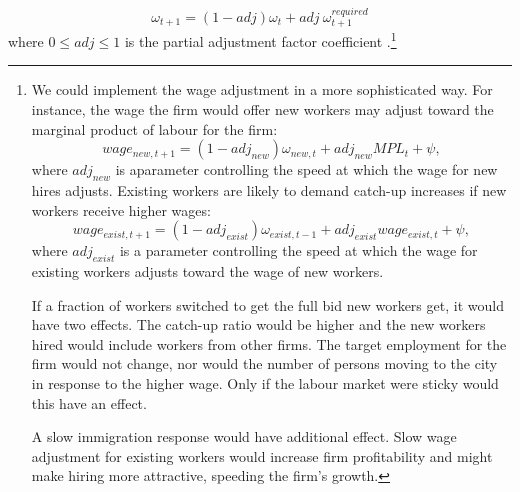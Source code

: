 \begin{equation}
\omega_{t+1}= (1-adj)\omega_{t} + adj\ \omega^{required}_{t+1}
\end{equation}
where $0\le adj \le 1$ is the partial adjustment factor coefficient
.\footnote{We could implement the wage adjustment in a more sophisticated way. For instance, the wage the firm would offer new workers may adjust toward the marginal product of labour for the firm: %
\begin{equation}wage_{new,t+1}= (1-adj_{new})\omega_{new,t} + adj_{new} MPL_{t}  +\psi, \end{equation}
where $adj_{new}$ is aparameter controlling the speed at which the wage for new hires adjusts. 
Existing workers are likely to demand catch-up increases if new workers receive higher wages:
\begin{equation} wage_{exist,t+1}= (1-adj_{exist}) \omega_{exist, t-1} + adj_{exist} wage_{exist,t}  +\psi, \end{equation}
where $adj_{exist}$ is a parameter controlling the speed at which the wage for existing workers adjusts toward the wage of new workers.

If a fraction of workers switched to get the full bid new workers get, it would have two effects. The catch-up ratio would be higher and the new workers hired would include workers from other firms. The target employment for the firm would not change, nor would the number of persons moving to the city in response to the higher wage. Only if the labour market were sticky would this have an effect.

A slow immigration response would have additional effect.
Slow wage adjustment for existing workers would increase firm profitability and might make hiring more attractive, speeding the firm's growth.}



